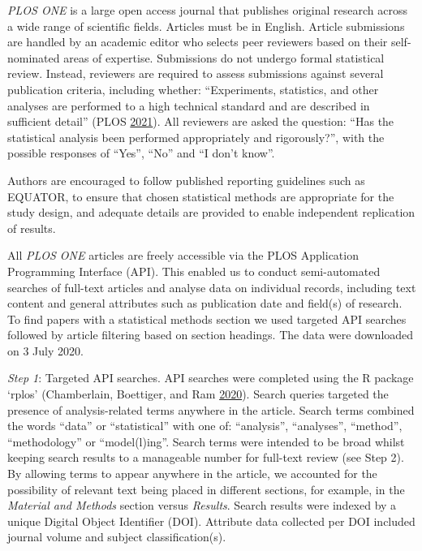 \documentclass[
]{article}
\begin{document}
\emph{PLOS ONE} is a large open access journal that publishes original research across a wide range of scientific fields. Articles must be in English. Article submissions are handled by an academic editor who selects peer reviewers based on their self-nominated areas of expertise. Submissions do not undergo formal statistical review. Instead, reviewers are required to assess submissions against several publication criteria, including whether: ``Experiments, statistics, and other analyses are performed to a high technical standard and are described in sufficient detail'' (PLOS \protect\hyperlink{ref-PLOS}{2021}). All reviewers are asked the question: ``Has the statistical analysis been performed appropriately and rigorously?'', with the possible responses of ``Yes'', ``No'' and ``I don't know''.

Authors are encouraged to follow published reporting guidelines such as EQUATOR, to ensure that chosen statistical methods are appropriate for the study design, and adequate details are provided to enable independent replication of results.

All \emph{PLOS ONE} articles are freely accessible via the PLOS Application Programming Interface (API). This enabled us to conduct semi-automated searches of full-text articles and analyse data on individual records, including text content and general attributes such as publication date and field(s) of research. To find papers with a statistical methods section we used targeted API searches followed by article filtering based on section headings. The data were downloaded on 3 July 2020.

\emph{Step 1}: Targeted API searches. API searches were completed using the R package `rplos' (Chamberlain, Boettiger, and Ram \protect\hyperlink{ref-rplos}{2020}). Search queries targeted the presence of analysis-related terms anywhere in the article. Search terms combined the words ``data'' or ``statistical'' with one of: ``analysis'', ``analyses'', ``method'', ``methodology'' or ``model(l)ing''. Search terms were intended to be broad whilst keeping search results to a manageable number for full-text review (see Step 2). By allowing terms to appear anywhere in the article, we accounted for the possibility of relevant text being placed in different sections, for example, in the \emph{Material and Methods} section versus \emph{Results}. Search results were indexed by a unique Digital Object Identifier (DOI). Attribute data collected per DOI included journal volume and subject classification(s).
\end{document}
